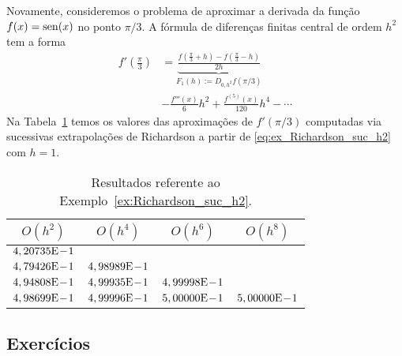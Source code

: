\begin{ex}\label{ex:Richardson_suc_h2}
  Novamente, consideremos o problema de aproximar a derivada da função $f(x) = \operatorname{sen}(x)$ no ponto $\pi/3$. A fórmula de diferenças finitas central de ordem $h^2$ tem a forma
  \begin{align}
    f'\left(\frac{\pi}{3}\right) &= \underbrace{\frac{f\left(\frac{\pi}{3}+h\right)-f\left(\frac{\pi}{3}-h\right)}{2h}}_{F_1(h) := D_{0,h^2}f(\pi/3)} \nonumber\\
          &- \frac{f'''(x)}{6}h^2 + \frac{f^{(5)}(x)}{120}h^4 - \cdots \label{eq:ex_Richardson_suc_h2}
  \end{align}
Na Tabela~\ref{tab:ex_Richardson_suc_h2} temos os valores das aproximações de $f'(\pi/3)$ computadas via sucessivas extrapolações de Richardson a partir de \eqref{eq:ex_Richardson_suc_h2} com $h=1$.

\begin{table}[h!]
  \centering
  \caption{Resultados referente ao Exemplo~\ref{ex:Richardson_suc_h2}.}
  \begin{tabular}{cccc}\hline
    $O(h^2)$ & $O(h^4)$ & $O(h^6)$ & $O(h^8)$\\ \hline
    $4,20735\mathrm{E}\!-\!1$ \\
    $4,79426\mathrm{E}\!-\!1$ & $4,98989\mathrm{E}\!-\!1$ \\
    $4,94808\mathrm{E}\!-\!1$ & $4,99935\mathrm{E}\!-\!1$ & $4,99998\mathrm{E}\!-\!1$ \\
    $4,98699\mathrm{E}\!-\!1$ & $4,99996\mathrm{E}\!-\!1$ & $5,00000\mathrm{E}\!-\!1$ & $5,00000\mathrm{E}\!-\!1$ \\\hline
  \end{tabular}
  \label{tab:ex_Richardson_suc_h2}
\end{table}



\end{ex}

\subsection{Exercícios}

